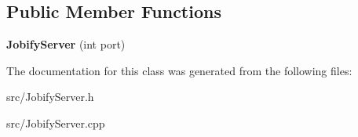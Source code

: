 \subsection*{Public Member Functions}
\begin{DoxyCompactItemize}
\item 
{\bfseries Jobify\+Server} (int port)\hypertarget{classJobifyServer_a44900e777fc90c01e251a6f7cc53242b}{}\label{classJobifyServer_a44900e777fc90c01e251a6f7cc53242b}

\end{DoxyCompactItemize}


The documentation for this class was generated from the following files\+:\begin{DoxyCompactItemize}
\item 
src/Jobify\+Server.\+h\item 
src/Jobify\+Server.\+cpp\end{DoxyCompactItemize}
